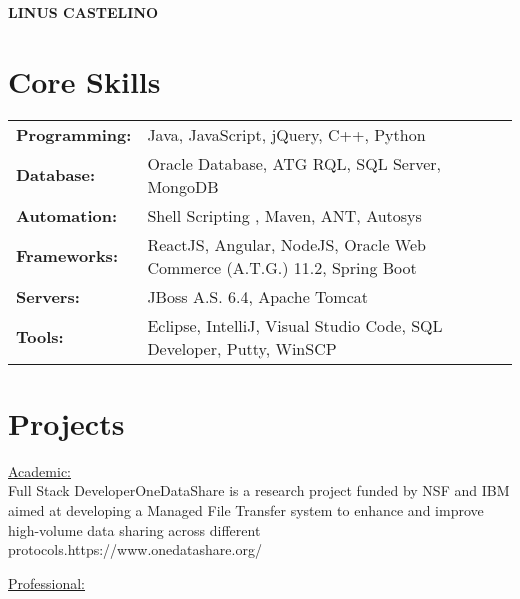 \documentclass[letter]{twentysecondcv}
\begin{document}
{\fontsize{28pt}{12pt}\selectfont\color{mainblue}\textbf{LINUS CASTELINO}} \\

\fontsize{10.5pt}{10pt}
\makeprofile %

\section{Core Skills}

\begin{tabular}{p{2.5cm}p{10.5cm}}
	\textbf{Programming:} & {Java, JavaScript, jQuery, C++, Python}\\
 	\textbf{Database:} & {Oracle Database, ATG RQL, SQL Server, MongoDB}\\
 	\textbf{Automation:} & {Shell Scripting , Maven, ANT, Autosys}\\
 	\textbf{Frameworks:} & {ReactJS, Angular, NodeJS, Oracle Web Commerce (A.T.G.) 11.2, Spring Boot}\\ 
 	\textbf{Servers:} & {JBoss A.S. 6.4, Apache Tomcat}\\
    \textbf{Tools:} & {Eclipse, IntelliJ, Visual Studio Code, SQL Developer, Putty, WinSCP}
    \vspace{5mm}
\end{tabular}

\section{Projects}

\begin{twenty} 
    \underline{Academic:}\\
	 {Full Stack Developer}{OneDataShare is a research project funded by NSF and IBM aimed at developing a Managed File Transfer system to enhance and improve high-volume data sharing across different protocols.}{https://www.onedatashare.org/}
	
	
	\underline{Professional:}\\
\end{twenty}
\end{document}
